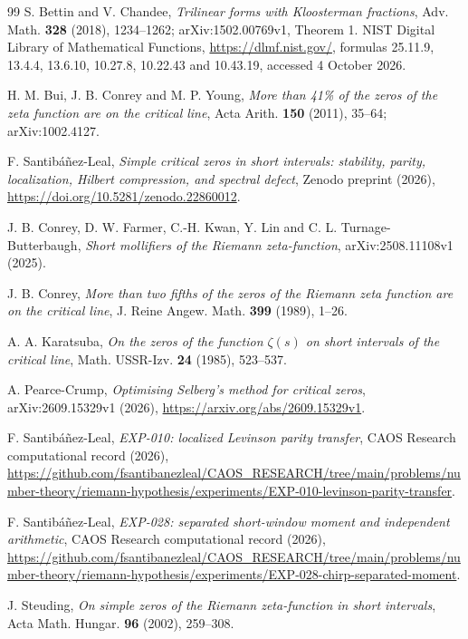 \documentclass[11pt]{article}
\theoremstyle{remark}
\begin{document}
\begin{thebibliography}{99}
 S. Bettin and V. Chandee,
\emph{Trilinear forms with Kloosterman fractions}, Adv. Math.
\textbf{328} (2018), 1234--1262; arXiv:1502.00769v1, Theorem 1.
 NIST Digital Library of Mathematical Functions,
\url{https://dlmf.nist.gov/}, formulas 25.11.9, 13.4.4, 13.6.10, 10.27.8,
10.22.43 and 10.43.19, accessed 4 October 2026.

\raggedright

H. M. Bui, J. B. Conrey and M. P. Young,
\emph{More than 41\% of the zeros of the zeta function are on the critical
line}, Acta Arith. \textbf{150} (2011), 35--64; arXiv:1002.4127.

F. Santib\'a\~nez-Leal,
\emph{Simple critical zeros in short intervals: stability, parity,
localization, Hilbert compression, and spectral defect},
Zenodo preprint (2026),
\url{https://doi.org/10.5281/zenodo.22860012}.

J. B. Conrey, D. W. Farmer, C.-H. Kwan, Y. Lin and
C. L. Turnage-Butterbaugh,
\emph{Short mollifiers of the Riemann zeta-function},
arXiv:2508.11108v1 (2025).

J. B. Conrey,
\emph{More than two fifths of the zeros of the Riemann zeta function are on
the critical line}, J. Reine Angew. Math. \textbf{399} (1989), 1--26.

A. A. Karatsuba,
\emph{On the zeros of the function $\zeta(s)$ on short intervals of the
critical line}, Math. USSR-Izv. \textbf{24} (1985), 523--537.

A. Pearce-Crump,
\emph{Optimising Selberg's method for critical zeros},
arXiv:2609.15329v1 (2026),
\url{https://arxiv.org/abs/2609.15329v1}.

F. Santib\'a\~nez-Leal,
\emph{EXP-010: localized Levinson parity transfer},
CAOS Research computational record (2026),
\url{https://github.com/fsantibanezleal/CAOS_RESEARCH/tree/main/problems/number-theory/riemann-hypothesis/experiments/EXP-010-levinson-parity-transfer}.

F. Santib\'a\~nez-Leal,
\emph{EXP-028: separated short-window moment and independent arithmetic},
CAOS Research computational record (2026),
\url{https://github.com/fsantibanezleal/CAOS_RESEARCH/tree/main/problems/number-theory/riemann-hypothesis/experiments/EXP-028-chirp-separated-moment}.

J. Steuding,
\emph{On simple zeros of the Riemann zeta-function in short intervals},
Acta Math. Hungar. \textbf{96} (2002), 259--308.


\end{thebibliography}
\end{document}
